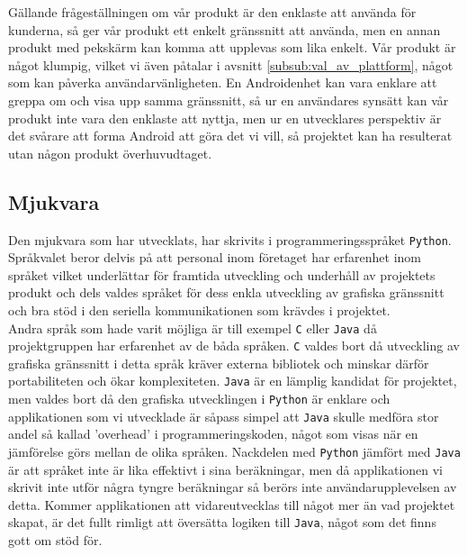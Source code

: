 \documentclass{article}
\begin{document}
            \noindent Gällande frågeställningen om vår produkt är den enklaste att använda för kunderna, så ger vår produkt ett enkelt gränssnitt att använda, men en annan produkt med pekskärm kan komma att upplevas som lika enkelt. Vår produkt är något klumpig, vilket vi även påtalar i avsnitt \ref{subsub:val_av_plattform}, något som kan påverka användarvänligheten. En Androidenhet kan vara enklare att greppa om och visa upp samma gränssnitt, så ur en användares synsätt kan vår produkt inte vara den enklaste att nyttja, men ur en utvecklares perspektiv är det svårare att forma Android att göra det vi vill, så projektet kan ha resulterat utan någon produkt överhuvudtaget.


        \subsection{Mjukvara} %
        \label{sub:d_mjukvara}

            Den mjukvara som har utvecklats, har skrivits i programmeringsspråket \texttt{Python}. Språk\-valet beror delvis på att personal inom företaget har erfarenhet inom språket vilket underlättar för framtida utveckling och underhåll av projektets produkt och dels valdes språket för dess enkla utveckling av grafiska gränssnitt och bra stöd i den seriella kommunikationen som krävdes i projektet. \\

            \noindent Andra språk som hade varit möjliga är till exempel \texttt{C} eller \texttt{Java} då projektgruppen har erfarenhet av de båda språken. \texttt{C} valdes bort då utveckling av grafiska gränssnitt i detta språk kräver externa bibliotek och minskar därför portabiliteten och ökar komplexiteten. \texttt{Java} är en lämplig kandidat för projektet, men valdes bort då den grafiska utvecklingen i \texttt{Python} är enklare och applikationen som vi utvecklade är såpass simpel att \texttt{Java} skulle medföra stor andel så kallad 'overhead' i programmeringskoden, något som visas när en jämförelse görs mellan de olika språken.\cite{Ferg}  Nackdelen med \texttt{Python} jämfört med \texttt{Java} är att språket inte är lika effektivt i sina beräkningar, men då applikationen vi skrivit inte utför några tyngre beräkningar så berörs inte användar\-upplevelsen  av detta. Kommer applikationen att vidareutvecklas till något mer än vad projektet skapat, är det fullt rimligt att översätta logiken till \texttt{Java}, något som det finns gott om stöd för.\cite{jython}
        
\end{document}
